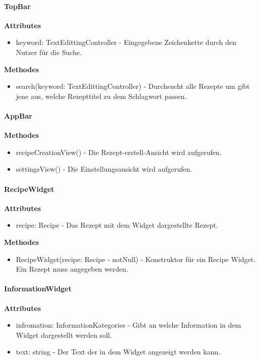 \documentclass[parskip=full]{scrartcl}
\begin{document}
        \paragraph{TopBar}
            \textbf{Attributes}
                \begin{itemize}
                    \item keyword: TextEdittingController - Eingegebene Zeichenkette durch den Nutzer für die Suche.
                \end{itemize}
            \textbf{Methodes}
                \begin{itemize}
                    \item search(keyword: TextEdittingController) - Durchsucht alle Rezepte um gibt jene aus, welche Rezepttitel zu dem Schlagwort passen.
                \end{itemize}
                
        \paragraph{AppBar}
            \textbf{Methodes}
                \begin{itemize}
                    \item recipeCreationView() - Die Rezept-erstell-Ansicht wird aufgerufen.
                    \item settingsView() - Die Einstellungsansicht wird aufgerufen.
                \end{itemize}

        \paragraph{RecipeWidget}
            \textbf{Attributes}
                 \begin{itemize}
                     \item recipe: Recipe - Das Rezept mit dem Widget dargestellte Rezept.
                 \end{itemize}
            \textbf{Methodes}
                \begin{itemize}
                    \item RecipeWidget(recipe: Recipe - notNull) - Konstruktor für ein Recipe Widget. Ein Rezept muss angegeben werden.
                \end{itemize}
                
        \paragraph{InformationWidget}
            \textbf{Attributes}
                \begin{itemize}
                    \item infromation: InformationKategories - Gibt an welche Information in dem Widget dargestellt werden soll.
                    \item text: string - Der Text der in dem Widget angezeigt werden kann.
                \end{itemize}
\end{document}
